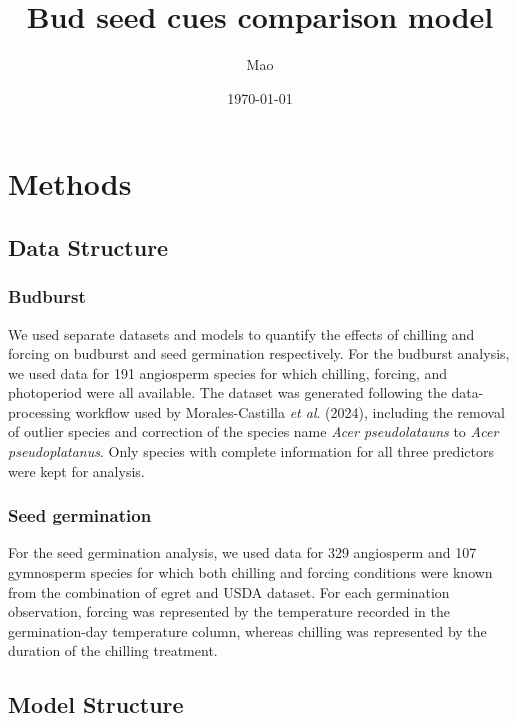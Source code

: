 \documentclass{article}
\begin{document}


\title{Bud seed cues comparison model}
\author{Mao}
\date{\today}
\maketitle

\section{Methods}
\subsection{Data Structure}
\subsubsection{Budburst}
We used separate datasets and models to quantify the effects of chilling and forcing on budburst and seed germination respectively. For the budburst analysis, we used data for 191 angiosperm species for which chilling, forcing, and photoperiod were all available. The dataset was generated following the data-processing workflow used by Morales-Castilla \textit{et al}. (2024), including the removal of outlier species and correction of the species name \textit{Acer pseudolatauns} to \textit{Acer pseudoplatanus}. Only species with complete information for all three predictors were kept for analysis.%
\subsubsection{Seed germination}
For the seed germination analysis, we used data for 329 angiosperm and 107 gymnosperm species for which both chilling and forcing conditions were known from the combination of egret and USDA dataset. %
For each germination observation, forcing was represented by the temperature recorded in the germination-day temperature column, whereas chilling was represented by the duration of the chilling treatment.

\subsection{Model Structure}
\end{document}
